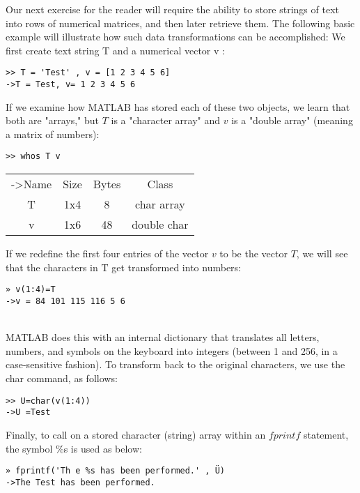 \documentclass[../main.tex]{subfiles}
\begin{document}
Our next exercise for the reader will require the ability to store strings of text into rows of numerical matrices, and then later retrieve them. The following basic example will illustrate how such data transformations can be accomplished: We first create text string $\mathrm{T}$ and a numerical vector $\mathrm{v}$ :

\begin{verbatim}
>> T = 'Test' , v = [1 2 3 4 5 6]
->T = Test, v= 1 2 3 4 5 6 

\end{verbatim}

If we examine how MATLAB has stored each of these two objects, we learn that both are "arrays," but $T$ is a "character array" and $v$ is a "double array" (meaning a matrix of numbers):
\begin{verbatim}>> whos T v \end{verbatim}
\noindent \begin{tabular}{cccc}
->Name  &Size  &Bytes & Class  \\
T & 1x4 & 8 & char array\\
v & 1x6 & 48 & double char
\end{tabular}

If we redefine the first four entries of the vector $v$ to be the vector $T$, we will see that the characters in $\mathrm{T}$ get transformed into numbers:\\

\begin{verbatim}
» v(1:4)=T
->v = 84 101 115 116 5 6 
\end{verbatim}\\

MATLAB does this with an internal dictionary that translates all letters, numbers, and symbols on the keyboard into integers (between 1 and 256, in a case-sensitive fashion). To transform back to the original characters, we use the char command, as follows:\\

\begin{verbatim}
>> U=char(v(1:4))
->U =Test 
\end{verbatim}

Finally, to call on a stored character (string) array within an $fprint f$ statement, the symbol \%s is used as below:

\begin{verbatim}
» fprintf('Th e %s has been performed.' , Ü)
->The Test has been performed. 
\end{verbatim}
\end{document}
